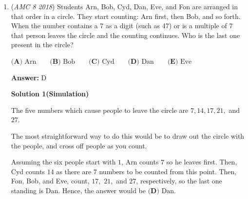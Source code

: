 \begin{enumerate}
 \textbf{Answer: }D



\textbf{Solution 1}

By adding up the numbers in each of the $6$ parentheses, we get: 

 $\frac{2}{1} \cdot \frac{3}{2} \cdot \frac{4}{3} \cdot \frac{5}{4} \cdot \frac{6}{5} \cdot \frac{7}{6}$.

 Using telescoping, most of the terms cancel out diagonally. We are left with $\frac{7}{1}$ which is equivalent to $7$. Thus, the answer would be $\boxed{\textbf{(D) }7}$.

 Also, you can also make the fractions $\frac{7!}{6!}$, which also yields $\boxed{\textbf{(D) }7}$




\textbf{Solution 2 (use this when your brain no longer works)}

$\frac{2}{1} \cdot \frac{3}{2} \cdot \frac{4}{3} \cdot \frac{5}{4} \cdot \frac{6}{5} \cdot \frac{7}{6} = \boxed{\textbf{(D)}\ 7}$.~themathkidwoohooooo

 


 


	\item (\textit{AMC 8 2018}) Students Arn, Bob, Cyd, Dan, Eve, and Fon are arranged in that order in a circle. They start counting: Arn first, then Bob, and so forth. When the number contains a 7 as a digit (such as 47) or is a multiple of 7 that person leaves the circle and the counting continues. Who is the last one present in the circle?


 $\textbf{(A) } \text{Arn}\qquad\textbf{(B) }\text{Bob}\qquad\textbf{(C) }\text{Cyd}\qquad\textbf{(D) }\text{Dan}\qquad \textbf{(E) }\text{Eve}$

 \textbf{Answer: }D



\textbf{Solution 1(Simulation)}

The five numbers which cause people to leave the circle are $7, 14, 17, 21,$ and $27.$

 The most straightforward way to do this would be to draw out the circle with the people, and cross off people as you count.

 Assuming the six people start with $1$, Arn counts $7$ so he leaves first. Then, Cyd counts $14$ as there are $7$ numbers to be counted from this point. Then, Fon, Bob, and Eve, count, $17,$ $21,$ and $27$, respectively, so the last one standing is Dan. Hence, the answer would be $\boxed{\textbf{(D) }\text{Dan}}$.


\end{enumerate}
